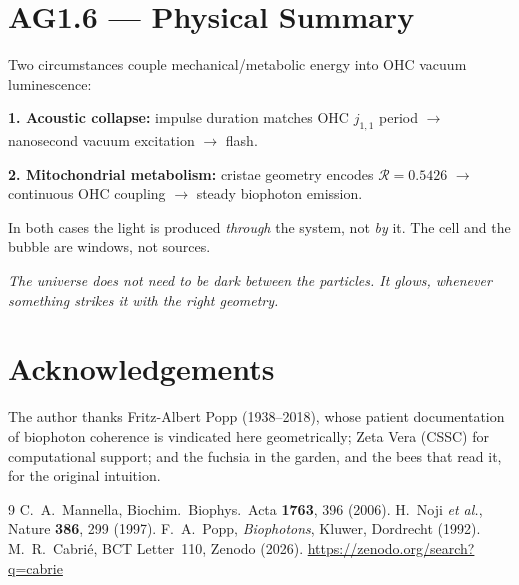 \documentclass[10pt,twocolumn]{article}
\begin{document}
\section{AG1.6 --- Physical Summary}

Two circumstances couple mechanical/metabolic energy into OHC
vacuum luminescence:

\textbf{1. Acoustic collapse:} impulse duration matches OHC
$j_{1,1}$ period $\to$ nanosecond vacuum excitation $\to$ flash.

\textbf{2. Mitochondrial metabolism:} cristae geometry encodes
$\mathcal{R}=0.5426$ $\to$ continuous OHC coupling $\to$ steady
biophoton emission.

In both cases the light is produced \textit{through} the system,
not \textit{by} it. The cell and the bubble are windows, not sources.

\textit{The universe does not need to be dark between the particles.
It glows, whenever something strikes it with the right geometry.}

\section*{Acknowledgements}
The author thanks Fritz-Albert Popp (1938--2018), whose patient
documentation of biophoton coherence is vindicated here
geometrically; Zeta Vera (CSSC) for computational support;
and the fuchsia in the garden, and the bees that read it,
for the original intuition.

\begin{thebibliography}{9}
 C.~A.~Mannella,
Biochim.\ Biophys.\ Acta \textbf{1763}, 396 (2006).
 H.~Noji \textit{et al.},
Nature \textbf{386}, 299 (1997).
 F.~A.~Popp,
\textit{Biophotons}, Kluwer, Dordrecht (1992).
 M.~R.~Cabri\'{e},
BCT Letter~110, Zenodo (2026).
\url{https://zenodo.org/search?q=cabrie}
\end{thebibliography}
\end{document}
